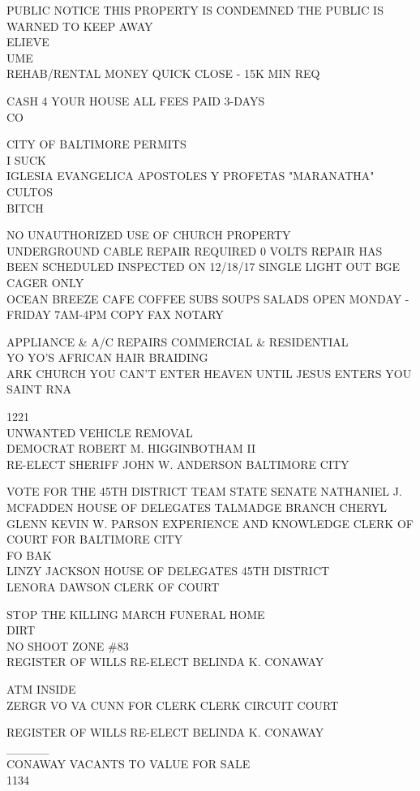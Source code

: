 \documentclass[10pt,letterpaper]{article}
\begin{document}
PUBLIC NOTICE THIS PROPERTY IS CONDEMNED THE PUBLIC IS WARNED TO KEEP AWAY\\
ELIEVE\\
UME\\
REHAB/RENTAL MONEY QUICK CLOSE {-} 15K MIN REQ

CASH 4 YOUR HOUSE ALL FEES PAID 3{-}DAYS\\
CO

CITY OF BALTIMORE PERMITS\\
I SUCK\\
IGLESIA EVANGELICA APOSTOLES Y PROFETAS "MARANATHA" CULTOS\\
BITCH

NO UNAUTHORIZED USE OF CHURCH PROPERTY\\
UNDERGROUND CABLE REPAIR REQUIRED 0 VOLTS REPAIR HAS BEEN SCHEDULED INSPECTED ON 12/18/17 SINGLE LIGHT OUT BGE\\
CAGER ONLY\\
OCEAN BREEZE CAFE COFFEE SUBS SOUPS SALADS OPEN MONDAY {-} FRIDAY 7AM{-}4PM COPY FAX NOTARY

APPLIANCE \& A/C REPAIRS COMMERCIAL \& RESIDENTIAL\\
YO YO'S AFRICAN HAIR BRAIDING\\
ARK CHURCH YOU CAN'T ENTER HEAVEN UNTIL JESUS ENTERS YOU\\
SAINT RNA

1221\\
UNWANTED VEHICLE REMOVAL\\
DEMOCRAT ROBERT M. HIGGINBOTHAM II\\
RE{-}ELECT SHERIFF JOHN W. ANDERSON BALTIMORE CITY

VOTE FOR THE 45TH DISTRICT TEAM STATE SENATE NATHANIEL J. MCFADDEN HOUSE OF DELEGATES TALMADGE BRANCH CHERYL GLENN KEVIN W. PARSON EXPERIENCE AND KNOWLEDGE CLERK OF COURT FOR BALTIMORE CITY\\
FO BAK\\
LINZY JACKSON HOUSE OF DELEGATES 45TH DISTRICT\\
LENORA DAWSON CLERK OF COURT

STOP THE KILLING MARCH FUNERAL HOME\\
DIRT\\
NO SHOOT ZONE \#83\\
REGISTER OF WILLS RE{-}ELECT BELINDA K. CONAWAY

ATM INSIDE\\
ZERGR VO VA CUNN FOR CLERK CLERK CIRCUIT COURT

REGISTER OF WILLS RE{-}ELECT BELINDA K. CONAWAY\\
\_\_\_\_\_\\
CONAWAY VACANTS TO VALUE FOR SALE\\
1134
\end{document}
